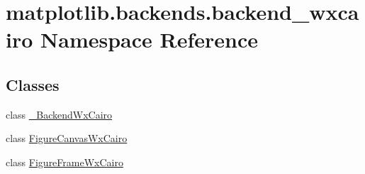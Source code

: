 \hypertarget{namespacematplotlib_1_1backends_1_1backend__wxcairo}{}\section{matplotlib.\+backends.\+backend\+\_\+wxcairo Namespace Reference}
\label{namespacematplotlib_1_1backends_1_1backend__wxcairo}
\subsection*{Classes}
\begin{DoxyCompactItemize}
\item 
class \hyperlink{classmatplotlib_1_1backends_1_1backend__wxcairo_1_1__BackendWxCairo}{\+\_\+\+Backend\+Wx\+Cairo}
\item 
class \hyperlink{classmatplotlib_1_1backends_1_1backend__wxcairo_1_1FigureCanvasWxCairo}{Figure\+Canvas\+Wx\+Cairo}
\item 
class \hyperlink{classmatplotlib_1_1backends_1_1backend__wxcairo_1_1FigureFrameWxCairo}{Figure\+Frame\+Wx\+Cairo}
\end{DoxyCompactItemize}
